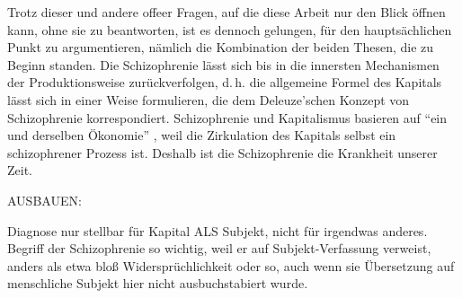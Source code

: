 \documentclass[12pt,
               DIV13,
               paper=a4,
               twoside=false,
               onehalfspacing,
               bibliography=totoc,
               toc=graduated,
               draft,
               ]{scrartcl}
\newcommand{\pc}[2]{\parencite[#1]{#2}}
\begin{document}
Trotz dieser und andere offeer Fragen, auf die diese Arbeit nur den
Blick öffnen kann, ohne sie zu beantworten, ist es dennoch gelungen,
für den hauptsächlichen Punkt zu argumentieren, nämlich die
Kombination der beiden Thesen, die zu Beginn standen. Die
Schizophrenie lässt sich bis in die innersten Mechanismen der
Produktionsweise zurückverfolgen, d.\,h. die allgemeine Formel des
Kapitals lässt sich in einer Weise formulieren, die dem Deleuze'schen
Konzept von Schizophrenie korrespondiert. Schizophrenie und
Kapitalismus basieren auf "`ein und derselben Ökonomie"' \pc{315}{ao},
weil die Zirkulation des Kapitals selbst ein schizophrener Prozess
ist. Deshalb ist die Schizophrenie die Krankheit unserer Zeit.

%
%
%
%
%
%
%

AUSBAUEN:

Diagnose nur stellbar für Kapital ALS Subjekt, nicht für irgendwas
anderes. Begriff der Schizophrenie so wichtig, weil er auf
Subjekt-Verfassung verweist, anders als etwa bloß Widersprüchlichkeit
oder so, auch wenn sie Übersetzung auf menschliche Subjekt hier nicht
ausbuchstabiert wurde.


\newpage
\printshorthands
\printbibliography
\end{document}
